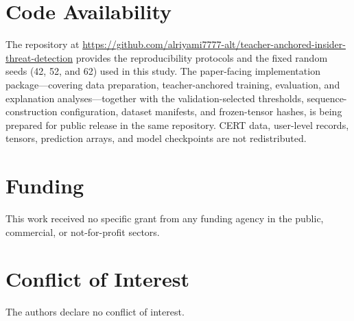 \section*{Code Availability}
The repository at
\url{https://github.com/alriyami7777-alt/teacher-anchored-insider-threat-detection}
provides the reproducibility protocols and the fixed random seeds (42, 52, and
62) used in this study. The paper-facing implementation package---covering data
preparation, teacher-anchored training, evaluation, and explanation
analyses---together with the validation-selected thresholds,
sequence-construction configuration, dataset manifests, and frozen-tensor
hashes, is being prepared for public release in the same repository. CERT data,
user-level records, tensors, prediction arrays, and model checkpoints are not
redistributed.

\section*{Funding}
This work received no specific grant from any funding agency in the public,
commercial, or not-for-profit sectors.

\section*{Conflict of Interest}
The authors declare no conflict of interest.